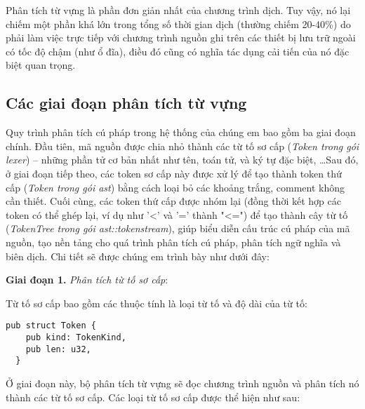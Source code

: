 Phân tích từ vựng là phần đơn giản nhất của chương trình dịch. Tuy vậy, nó lại chiếm một phần khá lớn trong tổng số thời gian dịch (thường chiếm 20-40\%) do phải làm việc trực tiếp với chương trình nguồn ghi trên các thiết bị lưu trữ ngoài có tốc độ chậm (như ổ đĩa), điều đó cũng có nghĩa tác dụng cải tiến của nó đặc biệt quan trọng.

\subsection{Các giai đoạn phân tích từ vựng}
Quy trình phân tích cú pháp trong hệ thống của chúng em bao gồm ba giai đoạn chính. Đầu tiên, mã nguồn được chia nhỏ thành các từ tố sơ cấp (\textit{Token trong gói lexer}) – những phần tử cơ bản nhất như tên, toán tử, và ký tự đặc biệt, \dots Sau đó, ở giai đoạn tiếp theo, các token sơ cấp này được xử lý để tạo thành token thứ cấp (\textit{Token trong gói ast}) bằng cách loại bỏ các khoảng trắng, comment không cần thiết. Cuối cùng, các token thứ cấp được nhóm lại (đồng thời kết hợp các token có thể ghép lại, ví dụ như '<' và '=' thành "<=") để tạo thành cây từ tố (\textit{TokenTree trong gói ast::tokenstream}), giúp biểu diễn cấu trúc cú pháp của mã nguồn, tạo nền tảng cho quá trình phân tích cú pháp, phân tích ngữ nghĩa và biên dịch. Chi tiết sẽ được chúng em trình bày như dưới đây:

\textbf{Giai đoạn 1.} \textit{Phân tích từ tố sơ cấp}:

Từ tố sơ cấp bao gồm các thuộc tính là loại từ tố và độ dài của từ tố:

\clearpage
\begin{lstlisting}[]
  pub struct Token {
    pub kind: TokenKind,
    pub len: u32,
  }
\end{lstlisting}

Ở giai đoạn này, bộ phân tích từ vựng sẽ đọc chương trình nguồn và phân tích nó thành các từ tố sơ cấp. Các loại từ tố sơ cấp được thể hiện như sau:

